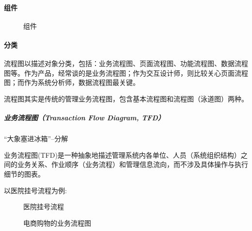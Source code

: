 \documentclass[letterpaper,11pt,english]{sphinxmanual}
\begin{document}
\paragraph{组件}
\label{\detokenize{chapter_knowledge/flow_chart:id7}}
\begin{figure}[H]
\centering
\capstart

\noindent{}
\caption{组件}\label{\detokenize{chapter_knowledge/flow_chart:id33}}\end{figure}


\paragraph{分类}
\label{\detokenize{chapter_knowledge/flow_chart:id8}}
流程图以描述对象分类，包括：业务流程图、页面流程图、功能流程图、数据流程图等。作为产品，经常谈的是业务流程图；作为交互设计师，则比较关心页面流程图；而作为系统分析师，数据流程图最关键。
%
\begin{footnote}[508]\sphinxAtStartFootnote
{}
%
\end{footnote}

流程图其实是传统的管理业务流程图，包含基本流程图和流程图（泳道图）两种。


\subparagraph{业务流程图（Transaction Flow Diagram, TFD）}
\label{\detokenize{chapter_knowledge/flow_chart:transaction-flow-diagram-tfd}}
“大象塞进冰箱”–分解

业务流程图(TFD)是一种抽象地描述管理系统内各单位、人员（系统组织结构）之间的业务关系、作业顺序（业务流程）和管理信息流向，而不涉及具体操作与执行细节的图表。

以医院挂号流程为例:

\begin{figure}[H]
\centering
\capstart

\noindent{}
\caption{医院挂号流程}\label{\detokenize{chapter_knowledge/flow_chart:id34}}\end{figure}

\begin{figure}[H]
\centering
\capstart

\noindent{}
\caption{电商购物的业务流程图}\label{\detokenize{chapter_knowledge/flow_chart:id35}}\label{\detokenize{chapter_knowledge/flow_chart:flow-chart-axure}}\end{figure}
\end{document}
